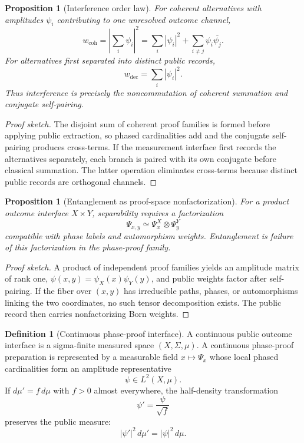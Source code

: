 \documentclass[11pt]{article}
\theoremstyle{plain}
\newtheorem{proposition}[theorem]{Proposition}
\theoremstyle{definition}
\newtheorem{definition}[theorem]{Definition}
\theoremstyle{remark}
\newenvironment{proofsketch}{\begin{proof}[Proof sketch]}{\end{proof}}
\begin{document}
\begin{proposition}[Interference order law]
For coherent alternatives with amplitudes \(\psi_i\) contributing to one unresolved outcome channel,
\[
w_{\mathrm{coh}}
=
\left|\sum_i\psi_i\right|^2
=
\sum_i|\psi_i|^2+\sum_{i\ne j}\psi_i\overline{\psi_j}.
\]
For alternatives first separated into distinct public records,
\[
w_{\mathrm{dec}}=\sum_i|\psi_i|^2.
\]
Thus interference is precisely the noncommutation of coherent summation and conjugate self-pairing.
\end{proposition}

\begin{proofsketch}
The disjoint sum of coherent proof families is formed before applying public extraction, so phased cardinalities add and the conjugate self-pairing produces cross-terms. If the measurement interface first records the alternatives separately, each branch is paired with its own conjugate before classical summation. The latter operation eliminates cross-terms because distinct public records are orthogonal channels.
\end{proofsketch}

\begin{proposition}[Entanglement as proof-space nonfactorization]
For a product outcome interface \(X\times Y\), separability requires a factorization
\[
\Psi_{x,y}\simeq \Psi^X_x\otimes\Psi^Y_y
\]
compatible with phase labels and automorphism weights. Entanglement is failure of this factorization in the phase-proof family.
\end{proposition}

\begin{proofsketch}
A product of independent proof families yields an amplitude matrix of rank one, \(\psi(x,y)=\psi_X(x)\psi_Y(y)\), and public weights factor after self-pairing. If the fiber over \((x,y)\) has irreducible paths, phases, or automorphisms linking the two coordinates, no such tensor decomposition exists. The public record then carries nonfactorizing Born weights.
\end{proofsketch}

\begin{definition}[Continuous phase-proof interface]
A continuous public outcome interface is a sigma-finite measured space \((X,\Sigma,\mu)\). A continuous phase-proof preparation is represented by a measurable field \(x\mapsto\Psi_x\) whose local phased cardinalities form an amplitude representative
\[
\psi\in L^2(X,\mu).
\]
If \(d\mu'=f\,d\mu\) with \(f>0\) almost everywhere, the half-density transformation
\[
\psi'=\frac{\psi}{\sqrt f}
\]
preserves the public measure:
\[
|\psi'|^2\,d\mu'=|\psi|^2\,d\mu.
\]
\end{definition}
\end{document}
